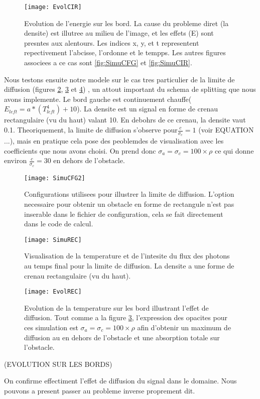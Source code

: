 \begin{figure}[H]
\centering
\texttt{[image: EvolCIR]} 
\decoRule
\caption[EvolCIR]{Evolution de l'energie sur les bord. La cause du probleme diret (la densite) est illutree au milieu de l'image, et les effets (E) sont presntes aux alentours. Les indices x, y, et t representent repectivement l'abcisse, l'ordonne et le tempps. Les autres figures associees a ce cas sont \ref{fig:SimuCFG} et \ref{fig:SimuCIR}.  }
\label{fig:EvolCIR}
\end{figure}

Nous testons ensuite notre modele sur le cas tres particulier de la limite de diffusion (figures \ref{fig:SimuCFG2}, \ref{fig:SimuREC} et \ref{fig:EvolREC}) , un attout important du schema de splitting que nous avons implemente. Le bord gauche est continuement chauffe($E_{left} = a*(T_{left}^4)+10$). La densite est un signal en forme de crenau rectangulaire (vu du haut) valant 10. En debohrs de ce crenau, la densite vaut 0.1. Theoriquement, la limite de diffusion s'observe pour$\frac{c}{\sigma_c} = 1$ (voir EQUATION ...), mais en pratique cela pose des peoblemdes de visualisation avec les coefficients que nous avons choisi. On prend donc $\sigma_a = \sigma_c = 100 \times \rho$ ce qui donne environ $\frac{c}{\sigma_c} = 30$ en dehors de l'obstacle.

\begin{figure}[!h]
\centering
\texttt{[image: SimuCFG2]} 
\decoRule
\caption[SimuCFG2]{Configurations utilisees pour illustrer la limite de diffusion. L'option necessaire pour obtenir un obstacle en forme de rectangule n'est pas inserable dans le fichier de configuration, cela se fait directement dans le code de calcul.}
\label{fig:SimuCFG2}
\end{figure}


\begin{figure}[!h]
\centering
\texttt{[image: SimuREC]} 
\decoRule
\caption[SimuREC]{Visualisation de la temperature et de l'intesite du flux des photons au temps final pour la limite de diffusion. La densite a une forme de crenau rectangulaire (vu du haut).}
\label{fig:SimuREC}
\end{figure}


\begin{figure}[!h]
\centering
\texttt{[image: EvolREC]} 
\decoRule
\caption[EvolREC]{Evolution de la temperature sur les bord illustrant l'effet de diffusion. Tout comme a la figure \ref{fig:SimuREC}, l'expression des opacites pour ces simulation est $\sigma_a = \sigma_c = 100 \times \rho$ afin d'obtenir un maximum de diffusion au en dehors de l'obstacle et une absorption totale sur l'obstacle.}
\label{fig:EvolREC}
\end{figure}
(EVOLUTION SUR LES BORDS)

On confirme effectiment l'effet de diffusion du signal dans le domaine. Nous pouvons a present passer au probleme inverse proprement dit. 


